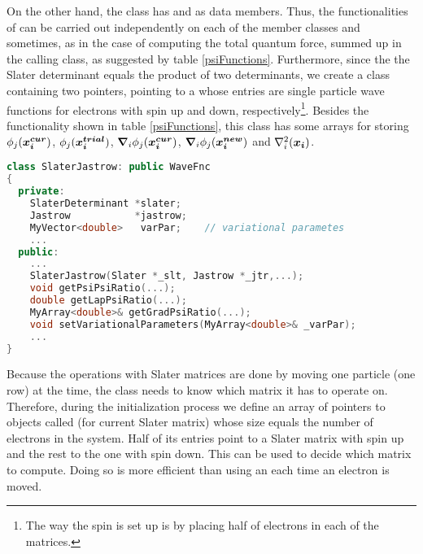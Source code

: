 On the other hand, the class  has  and  as data members. Thus, the functionalities of  can be carried out independently on each of the member classes and sometimes, as in the case of computing the total quantum force, summed up in the calling class, as suggested by table \ref{psiFunctions}. Furthermore, since the the Slater determinant equals the product of two determinants, we create a  class containing two pointers, pointing to a  whose entries are single particle wave functions for electrons with spin up and down, respectively\footnote{The way the spin is set up is by placing half of electrons in each of the matrices.}. Besides the functionality shown in table \ref{psiFunctions}, this class has some arrays for storing $\phi_j(\boldsymbol{x^{cur}_i})$,  $\phi_j(\boldsymbol{x^{trial}_i})$, $\boldsymbol{\nabla}_i \phi_j(\boldsymbol{x^{cur}_i})$, $\boldsymbol{\nabla}_i \phi_j(\boldsymbol{x^{new}_i})$ and $\nabla^{2}_{i}(\boldsymbol{x_i})$.
\begin{lstlisting}[language=c++]
class SlaterJastrow: public WaveFnc
{
  private:
    SlaterDeterminant *slater;  
    Jastrow           *jastrow;
    MyVector<double>   varPar;    // variational parametes
    ...
  public:
    ...
    SlaterJastrow(Slater *_slt, Jastrow *_jtr,...);
    void getPsiPsiRatio(...);
    double getLapPsiRatio(...);
    MyArray<double>& getGradPsiRatio(...);
    void setVariationalParameters(MyArray<double>& _varPar);
    ...
}
\end{lstlisting}

\noindent Because the operations with Slater matrices are done by moving one particle (one row) at the time, the  class needs to know which matrix it has to operate on. Therefore, during the initialization process we define an array of pointers to  objects called  (for current Slater matrix) whose size equals the number of electrons in the system. Half of its entries point to a Slater matrix with spin up and the rest to the one with spin down. This can be used to decide which matrix to compute. Doing so is more efficient than using an  each time an electron is moved.\\

